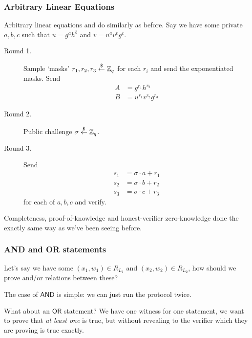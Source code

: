\subsubsection{Arbitrary Linear Equations}
\begin{example}
    Arbitrary linear equations and do similarly as before. Say we have some private $a, b, c$ such that $u = g^{a}h^{b}$ and $v = u^av^vg^c$.
    \begin{description}
        \item[Round 1.] Sample `masks' $r_1, r_2, r_3\overset{\$}{\leftarrow}\mathbb Z_q$ for each $r_i$ and send the exponentiated masks. Send
            \begin{align*}
                A & = g^{r_1}h^{r_2}        \\
                B & = u^{r_1}v^{r_2}g^{r_3}
            \end{align*}
        \item[Round 2.] Public challenge $\sigma\overset{\$}{\leftarrow}\mathbb Z_q$.
        \item[Round 3.] Send
            \begin{align*}
                s_1 & = \sigma\cdot a + r_1 \\
                s_2 & = \sigma\cdot b + r_2 \\
                s_3 & = \sigma\cdot c + r_3
            \end{align*} for each of $a, b, c$ and verify.
    \end{description}

    Completeness, proof-of-knowledge and honest-verifier zero-knowledge done the exactly same way as we've been seeing before.
\end{example}

\subsubsection{\textsf{AND} and \textsf{OR} statements}
Let's say we have some $(x_1, w_1)\in R_{L_1}$ and $(x_2, w_2)\in R_{L_2}$, how should we prove and/or relations between these?

The case of $\mathsf{AND}$ is simple: we can just run the protocol twice.

What about an $\mathsf{OR}$ statement? We have one witness for one statement, we want to prove that \emph{at least one} is true, but without revealing to the verifier which they are proving is true exactly.

